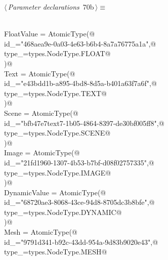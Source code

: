 \documentclass[
    a4paper,      %
    10pt,         %
    openright,    %
    notitlepage,  %
    parskip=half, %
]{scrreprt}       %
\theoremstyle{definition}                    %
\begin{document}
\begin{flushleft} \small
\begin{minipage}{\linewidth}\label{scrap121}\raggedright\small
{} $\langle\,${\itshape Parameter declarations}\nobreak\ {\footnotesize {70b}}$\,\rangle\equiv$
\vspace{-1ex}
\begin{list}{}{} \item
\mbox{}\lstinline@@\\
\mbox{}\lstinline@    FloatValue = AtomicType(@\\
\mbox{}\lstinline@        id_="468aea9e-0a03-4e63-b6b4-8a7a76775a1a",@\\
\mbox{}\lstinline@        type_=types.NodeType.FLOAT@\\
\mbox{}\lstinline@    )@\\
\mbox{}\lstinline@    Text = AtomicType(@\\
\mbox{}\lstinline@        id_="e43bdd1b-a895-4bd8-8d5a-b401a63f7a6f",@\\
\mbox{}\lstinline@        type_=types.NodeType.TEXT@\\
\mbox{}\lstinline@    )@\\
\mbox{}\lstinline@    Scene = AtomicType(@\\
\mbox{}\lstinline@        id_="bfb47e7text7-1b05-4864-8397-de30bf005ff8",@\\
\mbox{}\lstinline@        type_=types.NodeType.SCENE@\\
\mbox{}\lstinline@    )@\\
\mbox{}\lstinline@    Image = AtomicType(@\\
\mbox{}\lstinline@        id_="21fd1960-1307-4b53-b7bf-d08f02757335",@\\
\mbox{}\lstinline@        type_=types.NodeType.IMAGE@\\
\mbox{}\lstinline@    )@\\
\mbox{}\lstinline@    DynamicValue = AtomicType(@\\
\mbox{}\lstinline@        id_="68720ae3-8068-43ce-94d8-8705dc3b8bfe",@\\
\mbox{}\lstinline@        type_=types.NodeType.DYNAMIC@\\
\mbox{}\lstinline@    )@\\
\mbox{}\lstinline@    Mesh = AtomicType(@\\
\mbox{}\lstinline@        id_="9791d341-b92c-43dd-954a-9d83b9020e43",@\\
\mbox{}\lstinline@        type_=types.NodeType.MESH@\\

\end{list}
\end{minipage}
\end{flushleft}
\end{document}
